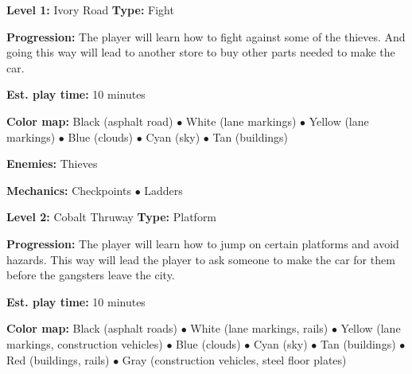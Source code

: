 \documentclass[12pt]{article}
\begin{document}
\begin{multicols}{2}
\noindent \textbf{Level 1:} Ivory Road \newline
\indent \textbf{Type:} Fight
\begin{addmargin}[5mm]{0em}
\textbf{Progression:} The player will learn how to fight against some of the thieves. And going this way will lead to another store to buy other parts needed to make the car. %
\end{addmargin}
\indent\indent \textbf{Est. play time:} 10 minutes
\begin{addmargin}[5mm]{0em}
\textbf{Color map:} Black (asphalt road) $\bullet$ White (lane markings) $\bullet$ Yellow (lane markings) $\bullet$ Blue (clouds) $\bullet$ Cyan (sky) $\bullet$ Tan (buildings)
\end{addmargin}
\begin{addmargin}[5mm]{0em}
\textbf{Enemies:} Thieves
\end{addmargin}
\begin{addmargin}[5mm]{0em}
\textbf{Mechanics:} Checkpoints $\bullet$ Ladders
\end{addmargin}

\columnbreak
\noindent \textbf{Level 2:} Cobalt Thruway \newline
\indent \textbf{Type:} Platform
\begin{addmargin}[5mm]{0em}
\textbf{Progression:} The player will learn how to jump on certain platforms and avoid hazards. This way will lead the player to ask someone to make the car for them before the gangsters leave the city.
\end{addmargin}
\indent\indent \textbf{Est. play time:} 10 minutes
\begin{addmargin}[5mm]{0em}
\textbf{Color map:} Black (asphalt roads) $\bullet$ White (lane markings, rails) $\bullet$ Yellow (lane markings, construction vehicles) $\bullet$ Blue (clouds) $\bullet$ Cyan (sky) $\bullet$ Tan (buildings) $\bullet$ Red (buildings, rails) $\bullet$ Gray (construction vehicles, steel floor plates)

\end{addmargin}
\end{multicols}
\end{document}
